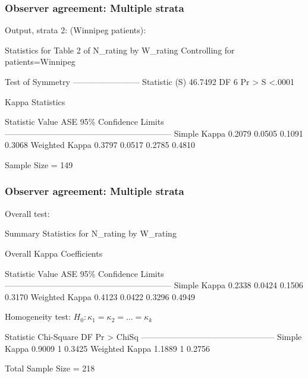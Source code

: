 \begin{frame}[fragile]
  \frametitle{Observer agreement: Multiple strata}

Output, strata 2: (Winnipeg patients):
\begin{Output}[baselinestretch=0.8,gobble=3]
           Statistics for Table 2 of N_rating by W_rating
                 Controlling for patients=Winnipeg

                          Test of Symmetry
                      ------------------------
                      Statistic (S)    46.7492
                      DF                     6
                      Pr > S            <.0001

                          Kappa Statistics
 
    Statistic          Value       ASE     95\% Confidence Limits
    ------------------------------------------------------------
    Simple Kappa      0.2079    0.0505       0.1091       0.3068
    Weighted Kappa    0.3797    0.0517       0.2785       0.4810

                         Sample Size = 149
\end{Output}
\end{frame}

\begin{frame}[fragile]
  \frametitle{Observer agreement: Multiple strata}

Overall test:
\begin{Output}[baselinestretch=0.8,gobble=3]
            Summary Statistics for N_rating by W_rating

                     Overall Kappa Coefficients
 
    Statistic          Value       ASE     95\% Confidence Limits
    ------------------------------------------------------------
    Simple Kappa      0.2338    0.0424       0.1506       0.3170
    Weighted Kappa    0.4123    0.0422       0.3296       0.4949
\end{Output}
Homogeneity test:  $H_0: \kappa_1 = \kappa_2 = \dots = \kappa_k$
\begin{Output}[baselinestretch=0.8]
 
          Statistic         Chi-Square    DF    Pr > ChiSq
          ------------------------------------------------
          Simple Kappa          0.9009     1      0.3425  
          Weighted Kappa        1.1889     1      0.2756  

                      Total Sample Size = 218
\end{Output}
\end{frame}

